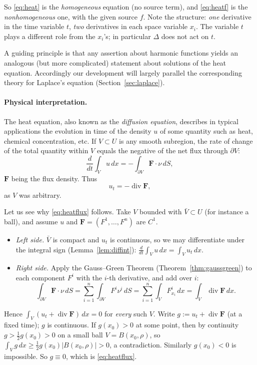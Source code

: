 \documentclass[11pt]{article}
\theoremstyle{plain}
\theoremstyle{definition}
\theoremstyle{remark}
\begin{document}
So \eqref{eq:heat} is the \emph{homogeneous} equation (no source term), and \eqref{eq:heatf} is the \emph{nonhomogeneous} one, with the given source $f$. Note the structure: \emph{one} derivative in the time variable $t$, \emph{two} derivatives in each space variable $x_i$. The variable $t$ plays a different role from the $x_i$'s; in particular $\Delta$ does not act on $t$.

A guiding principle is that any assertion about harmonic functions yields an analogous (but more complicated) statement about solutions of the heat equation. Accordingly our development will largely parallel the corresponding theory for Laplace's equation (Section~\ref{sec:laplace}).

\paragraph{Physical interpretation.} The heat equation, also known as the \emph{diffusion equation}, describes in typical applications the evolution in time of the density $u$ of some quantity such as heat, chemical concentration, etc. If $V \subset U$ is any smooth subregion, the rate of change of the total quantity within $V$ equals the negative of the net flux through $\partial V$:
$$ \frac{d}{dt}\int_V u\, dx = -\int_{\partial V} \mathbf{F}\cdot\nu\, dS, $$
$\mathbf{F}$ being the flux density. Thus
\begin{equation}\label{eq:heatflux}
u_t = -\operatorname{div}\mathbf{F},
\end{equation}
as $V$ was arbitrary.

Let us see why \eqref{eq:heatflux} follows. Take $V$ bounded with $\bar V \subset U$ (for instance a ball), and assume $u$ and $\mathbf F = (F^1,\dots,F^n)$ are $C^1$.
\begin{itemize}
    \item \emph{Left side.} $\bar V$ is compact and $u_t$ is continuous, so we may differentiate under the integral sign (Lemma~\ref{lem:diffint}): $\frac{d}{dt}\int_V u\, dx = \int_V u_t\, dx$.
    \item \emph{Right side.} Apply the Gauss--Green Theorem (Theorem~\ref{thm:gaussgreen}) to each component $F^i$ with the $i$-th derivative, and add over $i$:
    $$ \int_{\partial V}\mathbf F\cdot\nu\, dS = \sum_{i=1}^n \int_{\partial V} F^i\nu^i\, dS = \sum_{i=1}^n \int_V F^i_{x_i}\, dx = \int_V \operatorname{div}\mathbf F\, dx. $$
\end{itemize}
Hence $\int_V (u_t + \operatorname{div}\mathbf F)\, dx = 0$ for \emph{every} such $V$. Write $g := u_t + \operatorname{div}\mathbf F$ (at a fixed time); $g$ is continuous. If $g(x_0) > 0$ at some point, then by continuity $g > \frac12 g(x_0) > 0$ on a small ball $V = B(x_0,\rho)$, so $\int_V g\, dx \geq \frac12 g(x_0)|B(x_0,\rho)| > 0$, a contradiction. Similarly $g(x_0) < 0$ is impossible. So $g \equiv 0$, which is \eqref{eq:heatflux}.
\end{document}
